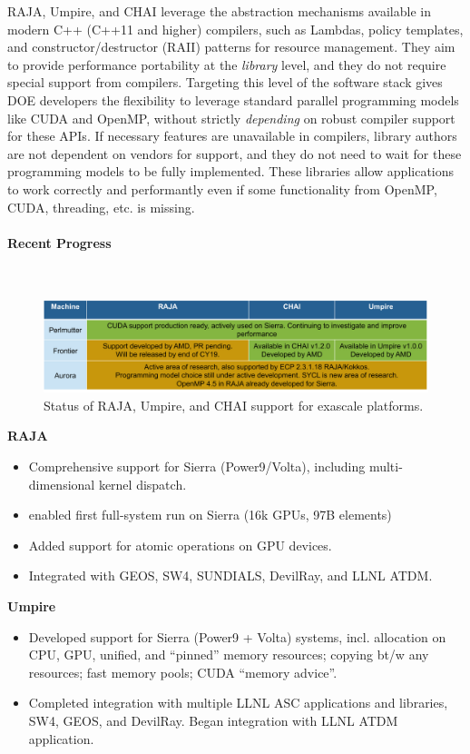 RAJA, Umpire, and CHAI leverage the abstraction mechanisms available in
modern C++ (C++11 and higher) compilers, such as Lambdas, policy
templates, and constructor/destructor (RAII) patterns for resource
management.  They aim to provide performance portability at the {\it
library} level, and they do not require special support from compilers.
Targeting this level of the software stack gives DOE developers the
flexibility to leverage standard parallel programming models like CUDA
and OpenMP, without strictly {\it depending} on robust compiler support
for these APIs.  If necessary features are unavailable in compilers,
library authors are not dependent on vendors for support, and they do not
need to wait for these programming models to be fully implemented.  These
libraries allow applications to work correctly and performantly even if
some functionality from OpenMP, CUDA, threading, etc. is missing.


\paragraph{Recent Progress} \leavevmode \\

\begin{figure}[htb]
\centering
\includegraphics[width=\textwidth]{projects/2.3.6-NNSA/2.3.6.02-LLNL-ATDM/raja-umpire-chai-support}
\caption{
Status of RAJA, Umpire, and CHAI support for exascale platforms.
}
\end{figure}

{\bf RAJA}
\begin{itemize}
\item Comprehensive support for Sierra (Power9/Volta),
      including multi-dimensional kernel dispatch.
\item enabled first full-system run on Sierra (16k GPUs, 97B elements)
\item Added support for atomic operations on GPU devices.
\item Integrated with GEOS, SW4, SUNDIALS, DevilRay, and LLNL ATDM.
\end{itemize}

{\bf Umpire}
\begin{itemize}
\item Developed support for Sierra (Power9 + Volta) systems, incl. allocation
      on CPU, GPU, unified, and “pinned” memory resources; copying bt/w any
      resources; fast memory pools; CUDA ``memory advice''.
\item Completed integration with multiple LLNL ASC applications and libraries,
      SW4, GEOS, and DevilRay. Began integration with LLNL ATDM application.
\end{itemize}

